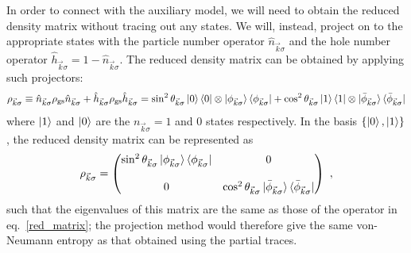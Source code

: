 \documentclass[prb]{revtex4-2}
\begin{document}
In order to connect with the auxiliary model, we will need to obtain the reduced density matrix without tracing out any states. We will, instead, project on to the appropriate states with the particle number operator \(\hat n_{\vec k\sigma}\) and the hole number operator \(\hat h_{\vec k\sigma} = 1 - \hat n_{\vec k\sigma}\). The reduced density matrix can be obtained by applying such projectors:
\begin{equation}\begin{aligned}
	\rho_{\vec k\sigma} \equiv \hat n_{\vec k\sigma}\rho_\text{gs} \hat n_{\vec k\sigma} + \hat h_{\vec k\sigma}\rho_\text{gs} \hat h_{\vec k\sigma} = \sin^2\theta_{\vec k\sigma} \ket{0}\bra{0}\otimes\ket{\phi_{\vec k\sigma}}\bra{\phi_{\vec k\sigma}} + \cos^2\theta_{\vec k\sigma} \ket{1}\bra{1}\otimes\ket{\bar\phi_{\vec k\sigma}}\bra{\bar\phi_{\vec k\sigma}}\label{red_matrix_projection}
\end{aligned}\end{equation}
where \(\ket{1}\) and \(\ket{0}\) are the \(n_{\vec k\sigma}=1\) and 0 states respectively. In the basis \(\left\{ \ket{0}, \ket{1} \right\} \), the reduced density matrix can be represented as
\begin{equation}\begin{aligned}
	\rho_{\vec k\sigma} = \begin{pmatrix}\sin^2\theta_{\vec k\sigma} \ket{\phi_{\vec k\sigma}}\bra{\phi_{\vec k\sigma}} & 0 \\ \\
	0 & \cos^2\theta_{\vec k\sigma} \ket{\bar\phi_{\vec k\sigma}}\bra{\bar\phi_{\vec k\sigma}}
	\end{pmatrix} ~,
\end{aligned}\end{equation}
such that the eigenvalues of this matrix are the same as those of the operator in eq.~\ref{red_matrix}; the projection method would therefore give the same von-Neumann entropy as that obtained using the partial traces.
\end{document}
